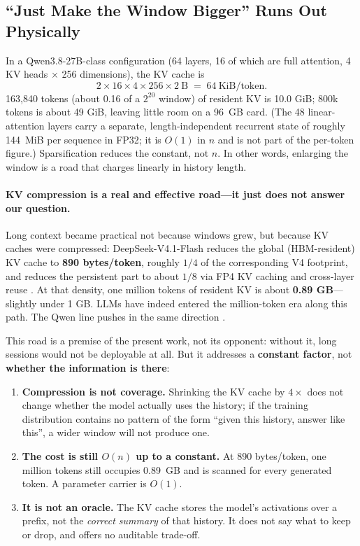 \documentclass[sigconf,nonacm]{acmart}
\begin{document}
\subsection{``Just Make the Window Bigger'' Runs Out Physically}
In a Qwen3.8-27B-class configuration (64 layers, 16 of which are full attention, 4 KV heads
$\times$ 256 dimensions), the KV cache is
\[
2 \times 16 \times 4 \times 256 \times 2\ \text{B} \;=\; 64\ \mathrm{KiB/token}.
\]
163,840 tokens (about 0.16 of a $2^{20}$ window) of resident KV is 10.0 GiB; 800k tokens is about 49 GiB,
leaving little room on a 96~GB card. (The 48 linear-attention layers carry a separate, length-independent
recurrent state of roughly 144~MiB per sequence in FP32; it is $O(1)$ in $n$ and is not part of the
per-token figure.) Sparsification reduces the constant, not $n$. In other words, enlarging the window is a road that
charges linearly in history length.

\paragraph{KV compression is a real and effective road---it just does not answer our question.}
Long context became practical not because windows grew, but because KV caches were compressed:
DeepSeek-V4.1-Flash reduces the global (HBM-resident) KV cache to \textbf{890 bytes/token}, roughly
$1/4$ of the corresponding V4 footprint, and reduces the persistent part to about $1/8$ via FP4 KV
caching and cross-layer reuse \cite{deepseekv41flash2026}. At that density, one million tokens of
resident KV is about \textbf{0.89 GB}---slightly under 1 GB. LLMs have indeed entered the
million-token era along this path. The Qwen line pushes in the same direction
\cite{qwen3report2025,qwen38report2026}.

This road is a premise of the present work, not its opponent: without it, long sessions would not be
deployable at all. But it addresses a \textbf{constant factor}, not \textbf{whether the information is
there}:

\begin{enumerate}[leftmargin=1.2em]
\item \textbf{Compression is not coverage.} Shrinking the KV cache by $4\times$ does not change whether
the model actually uses the history; if the training distribution contains no pattern of the form
``given this history, answer like this'', a wider window will not produce one.
\item \textbf{The cost is still $O(n)$ up to a constant.} At 890 bytes/token, one million tokens still
occupies 0.89~GB and is scanned for every generated token. A parameter carrier is $O(1)$.
\item \textbf{It is not an oracle.} The KV cache stores the model's activations over a prefix, not the
\emph{correct summary} of that history. It does not say what to keep or drop, and offers no auditable
trade-off.
\end{enumerate}
\end{document}
